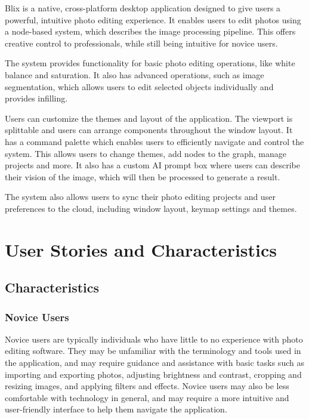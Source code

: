 \documentclass[11pt,a4paper]{article}
\begin{document}
Blix is a native, cross-platform desktop application designed to give users a
powerful, intuitive photo editing experience. It enables users to edit photos 
using a node-based system, which describes the image processing pipeline. This
offers creative control to professionals, while still being intuitive for 
novice users.

The system provides functionality for basic photo editing operations, like white
balance and saturation. It also has advanced operations, such as image
segmentation, which allows users to edit selected objects individually and
provides infilling. 

Users can customize the themes and layout of the application. The viewport is
splittable and users can arrange components throughout the window layout. It has
a command palette which enables users to efficiently navigate and control the
system. This allows users to change themes, add nodes to the graph, manage
projects and more. It also has a custom AI prompt box where users can describe
their vision of the image, which will then be processed to generate a result.

The system also allows users to sync their photo editing projects and user
preferences to the cloud, including window layout, keymap settings and themes.

\pagebreak


\section*{User Stories and Characteristics}

\subsection*{Characteristics}

\subsubsection*{Novice Users}

Novice users are typically individuals who have little to no experience with
photo editing software. They may be unfamiliar with the terminology and tools
used in the application, and may require guidance and assistance with basic
tasks such as importing and exporting photos, adjusting brightness and contrast,
cropping and resizing images, and applying filters and effects. Novice users may
also be less comfortable with technology in general, and may require a more
intuitive and user-friendly interface to help them navigate the application.
\end{document}
